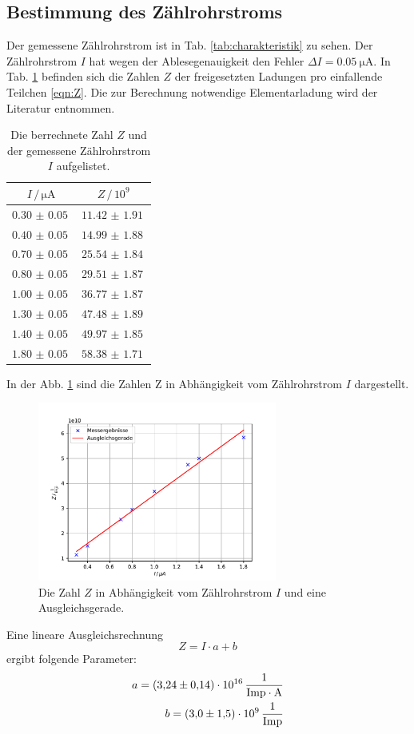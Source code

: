 \subsection{Bestimmung des Zählrohrstroms}
\label{sec:zaehlstrom}
Der gemessene Zählrohrstrom ist in Tab. \ref{tab:charakteristik} zu sehen.
Der Zählrohrstrom $I$ hat wegen der Ablesegenauigkeit den Fehler $\Delta I = \SI{0.05}{\micro \ampere}$.
In Tab. \ref{tab:zahl_z} befinden sich die Zahlen $Z$ der freigesetzten Ladungen pro einfallende Teilchen \eqref{eqn:Z}.
Die zur Berechnung notwendige Elementarladung wird der Literatur entnommen. \cite{konst}
\\
\begin{table}
    \centering
    \begin{tabular}{cc}
        \toprule
        $I \,/\, \si{\micro \ampere}$ & $Z \,/\, 10^9$ \\
        \midrule
        $\SI{0.30(5)}{}$ & $\SI{11.42(191)}{}$ \\
        $\SI{0.40(5)}{}$ & $\SI{14.99(188)}{}$ \\
        $\SI{0.70(5)}{}$ & $\SI{25.54(184)}{}$ \\
        $\SI{0.80(5)}{}$ & $\SI{29.51(187)}{}$ \\
        $\SI{1.00(5)}{}$ & $\SI{36.77(187)}{}$ \\
        $\SI{1.30(5)}{}$ & $\SI{47.48(189)}{}$ \\
        $\SI{1.40(5)}{}$ & $\SI{49.97(185)}{}$ \\
        $\SI{1.80(5)}{}$ & $\SI{58.38(171)}{}$ \\
        \bottomrule
    \end{tabular}
    \caption{Die berrechnete Zahl $Z$ und der gemessene Zählrohrstrom $I$ aufgelistet.}
    \label{tab:zahl_z}
\end{table}
In der Abb. \ref{fig:zahl_z} sind die Zahlen Z in Abhängigkeit vom Zählrohrstrom $I$ dargestellt.
\begin{figure}
    \centering
    \includegraphics[width=0.7\textwidth]{content/data/zaehlrohrstrom.pdf}
    \caption{Die Zahl $Z$ in Abhängigkeit vom Zählrohrstrom $I$ und eine Ausgleichsgerade. \cite{matplotlib} \cite{scipy} \cite{numpy}}
    \label{fig:zahl_z}
\end{figure}
\FloatBarrier
Eine lineare Ausgleichsrechnung
\begin{equation*}
    Z = I \cdot a + b
\end{equation*}
ergibt folgende Parameter:
\begin{align*}
    a = \SI{3.24(14)e16}{\frac{1}{Imp \cdot \ampere}} \\
    b = \SI{3.0(15)e9}{\frac{1}{Imp}}
\end{align*}